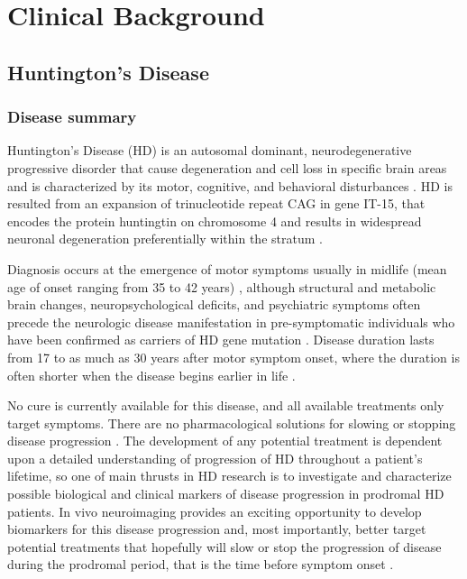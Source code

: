 \section{Clinical Background}
\label{clinicalBackground}

\subsection{Huntington's Disease}

\subsubsection{Disease summary}

\noindent Huntington's Disease (HD) is an autosomal dominant, neurodegenerative progressive disorder that cause degeneration and cell loss in specific brain areas and is characterized by its motor, cognitive, and behavioral disturbances \cite{PREDICTHD}. HD is resulted from an expansion of trinucleotide repeat CAG in gene IT-15, that encodes the protein huntingtin on chromosome 4 \cite{Huntington1993} and results in widespread neuronal degeneration preferentially within the stratum \cite{Montoya2006}.

Diagnosis occurs at the emergence of motor symptoms usually in midlife (mean age of onset ranging from 35 to 42 years) \cite{Martin1986}, although structural and metabolic brain changes, neuropsychological deficits, and psychiatric symptoms often precede the neurologic disease manifestation in pre-symptomatic individuals who have been confirmed as carriers of HD gene mutation \cite{Paulsen2001, Campodonico1998, Aylward2000, Harris1999}. Disease duration lasts from 17 to as much as 30 years after motor symptom onset, where the duration is often shorter when the disease begins earlier in life \cite{Martin1986, Gomez-Tortosa2001}.

No cure is currently available for this disease, and all available treatments only target symptoms. There are no pharmacological solutions for slowing or stopping disease progression \cite{Frank2010}. The development of any potential treatment is dependent upon a detailed understanding of progression of HD throughout a patient's lifetime, so one of main thrusts in HD research is to investigate and characterize possible biological and clinical markers of disease progression in prodromal HD patients. In vivo neuroimaging provides an exciting opportunity to develop biomarkers for this disease progression and, most importantly, better target potential treatments that hopefully will slow or stop the progression of disease during the prodromal period, that is the time before symptom onset \cite{Paulsen2008}.
\newline


